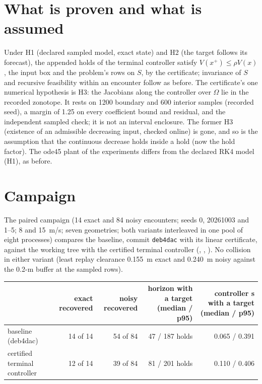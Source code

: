 \documentclass[11pt]{article}
\begin{document}
\section{What is proven and what is assumed}
Under H1 (declared sampled model, exact state) and H2 (the target follows
its forecast), the appended holds of the terminal controller satisfy
$V(x^+)\le\rho V(x)$, the input box and the problem's rows on $S$, by the
certificate; invariance of $S$ and recursive feasibility within an encounter
follow as before. The certificate's one numerical hypothesis is H3: the
Jacobians along the controller over $\Omega$ lie in the recorded zonotope.
It rests on 1200 boundary and 600 interior samples (recorded seed), a margin
of 1.25 on every coefficient bound and residual, and the independent sampled
check; it is not an interval enclosure. The former H3 (existence of an
admissible decreasing input, checked online) is gone, and so is the
assumption that the continuous decrease holds inside a hold (now the hold
factor). The ode45 plant of the experiments differs from the declared RK4
model (H1), as before.

\section{Campaign}
The paired campaign (14 exact and 84 noisy encounters; seeds 0, 20261003 and
1--5; 8 and 15~m/s; seven geometries; both variants interleaved in one pool
of eight processes) compares the baseline, commit \texttt{deb4dac} with its
linear certificate, against the working tree with the certified terminal
controller (, ,
). No collision in either variant (least replay
clearance 0.155~m exact and 0.240~m noisy against the 0.2-m buffer at the
sampled rows).

\begin{center}\small
\begin{tabular}{lrrrr}
\toprule
 & exact recovered & noisy recovered & horizon with a target (median / p95) & controller s with a target (median / p95) \\
\midrule
baseline (deb4dac) & 14 of 14 & 54 of 84 & 47 / 187 holds & 0.065 / 0.391 \\
certified terminal controller & 12 of 14 & 39 of 84 & 81 / 201 holds & 0.110 / 0.406 \\
\bottomrule
\end{tabular}
\end{center}
\end{document}
